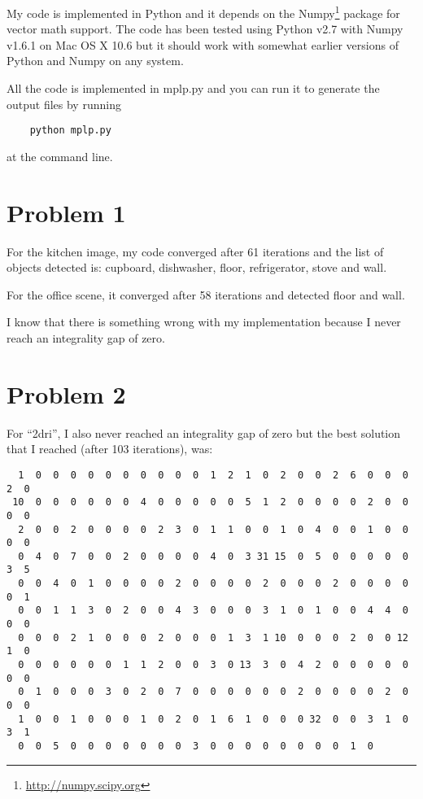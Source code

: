 \documentclass[11pt]{article}
\newcommand{\code}[1]{{\sffamily #1}}
\begin{document}
My code is implemented in \code{Python} and it depends on the
\code{Numpy}\footnote{\url{http://numpy.scipy.org}} package for vector
math support. The code has been tested using \code{Python v2.7} with
\code{Numpy v1.6.1} on \code{Mac OS X 10.6} but it should work with somewhat
earlier versions of \code{Python} and \code{Numpy} on any system.

All the code is implemented in \code{mplp.py} and you can run it to generate
the output files by running
\begin{lstlisting}
    python mplp.py
\end{lstlisting}
at the command line.

\section{Problem 1}

For the kitchen image, my code converged after 61 iterations and the list of
objects detected is:
\code{cupboard}, \code{dishwasher}, \code{floor}, \code{refrigerator},
\code{stove} and \code{wall}.

For the office scene, it converged after 58 iterations and detected
\code{floor} and \code{wall}.

I know that there is something wrong with my implementation because I never
reach an integrality gap of zero.

\newpage
\section{Problem 2}

For ``2dri'', I also never reached an integrality gap of zero but the best
solution that I reached (after 103 iterations), was:

\begin{lstlisting}
  1  0  0  0  0  0  0  0  0  0  0  1  2  1  0  2  0  0  2  6  0  0  0  2  0
 10  0  0  0  0  0  0  4  0  0  0  0  0  5  1  2  0  0  0  0  2  0  0  0  0
  2  0  0  2  0  0  0  0  2  3  0  1  1  0  0  1  0  4  0  0  1  0  0  0  0
  0  4  0  7  0  0  2  0  0  0  0  4  0  3 31 15  0  5  0  0  0  0  0  3  5
  0  0  4  0  1  0  0  0  0  2  0  0  0  0  2  0  0  0  2  0  0  0  0  0  1
  0  0  1  1  3  0  2  0  0  4  3  0  0  0  3  1  0  1  0  0  4  4  0  0  0
  0  0  0  2  1  0  0  0  2  0  0  0  1  3  1 10  0  0  0  2  0  0 12  1  0
  0  0  0  0  0  0  1  1  2  0  0  3  0 13  3  0  4  2  0  0  0  0  0  0  0
  0  1  0  0  0  3  0  2  0  7  0  0  0  0  0  0  2  0  0  0  0  2  0  0  0
  1  0  0  1  0  0  0  1  0  2  0  1  6  1  0  0  0 32  0  0  3  1  0  3  1
  0  0  5  0  0  0  0  0  0  0  3  0  0  0  0  0  0  0  0  1  0
\end{lstlisting}
\end{document}

